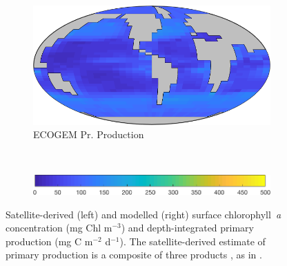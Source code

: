 \documentclass{article}
\begin{document}
\begin{figure}[htbp]
\begin{subfigure}{.5\textwidth}
\end{subfigure}%
\begin{subfigure}{.5\textwidth}
\centering
 \caption{ECOGEM Pr. Production}
\includegraphics[width=0.95\linewidth]{Final_figures/ECOGEM/PrimaryProdn.png}
\end{subfigure}%
\\[+0.2cm]
\begin{subfigure}{.5\textwidth}
 \centering
 \includegraphics[width=0.95\linewidth]{Final_figures/ECOGEM/PrimaryProdn_clrbar.png}
\end{subfigure}
\caption{Satellite-derived (left) and modelled (right) surface chlorophyll~\textit{a} concentration (mg Chl m$^{-3}$) and depth-integrated primary production (mg C m$^{-2}$ d$^{-1}$). The satellite-derived estimate of primary production is a composite of three products \citep{Behrenfeld:1997,Carr:2006,Westberry:2008}, as in \citet[][their Figure~12]{Yool:2013a}.}
\label{fig:chl_prpr}
\end{figure}
\end{document}

